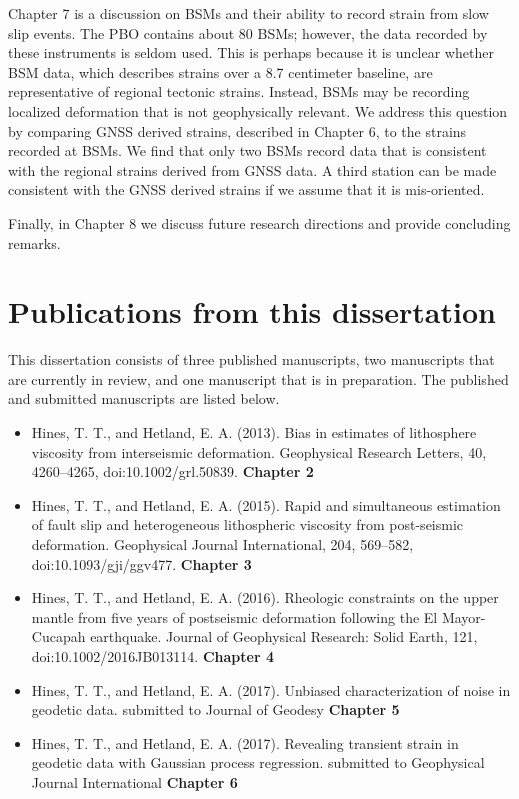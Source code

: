 Chapter 7 is a discussion on BSMs and their ability to record strain
from slow slip events. The PBO contains about 80 BSMs; however, the
data recorded by these instruments is seldom used. This is perhaps
because it is unclear whether BSM data, which describes strains over a
8.7 centimeter baseline, are representative of regional tectonic
strains. Instead, BSMs may be recording localized deformation that is
not geophysically relevant. We address this question by comparing GNSS
derived strains, described in Chapter 6, to the strains recorded at
BSMs. We find that only two BSMs record data that is consistent with
the regional strains derived from GNSS data. A third station can be
made consistent with the GNSS derived strains if we assume that it is
mis-oriented.

Finally, in Chapter 8 we discuss future research directions and
provide concluding remarks.

\section{Publications from this dissertation}
This dissertation consists of three published manuscripts, two
manuscripts that are currently in review, and one manuscript that is
in preparation. The published and submitted manuscripts are listed
below.

\begin{itemize}
\item{Hines, T. T., and Hetland, E. A. (2013). Bias in estimates of lithosphere viscosity from interseismic deformation. Geophysical Research Letters, 40, 4260--4265, doi:10.1002/grl.50839. \textbf{Chapter 2}}  
\item{Hines, T. T., and Hetland, E. A. (2015). Rapid and simultaneous estimation of fault slip and heterogeneous lithospheric viscosity from post-seismic deformation. Geophysical Journal International, 204, 569–582, doi:10.1093/gji/ggv477. \textbf{Chapter 3}} 
\item{Hines, T. T., and Hetland, E. A. (2016). Rheologic constraints on the upper mantle from five years of postseismic deformation following the El Mayor-Cucapah earthquake. Journal of Geophysical Research: Solid Earth, 121, doi:10.1002/2016JB013114. \textbf{Chapter 4}}
\item{Hines, T. T., and Hetland, E. A. (2017). Unbiased characterization of noise in geodetic data. submitted to Journal of Geodesy \textbf{Chapter 5}}
\item{Hines, T. T., and Hetland, E. A. (2017). Revealing transient strain in geodetic data with Gaussian process regression. submitted to Geophysical Journal International \textbf{Chapter 6}} 
\end{itemize}
